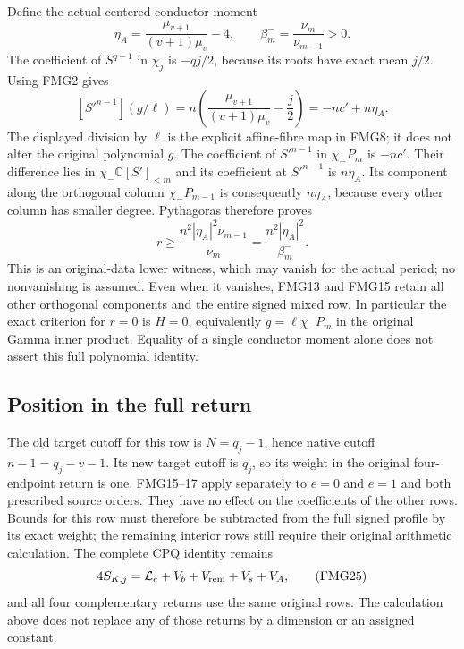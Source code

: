 \documentclass[11pt,a4paper]{article}
\begin{document}
Define the actual centered conductor moment
\[
 \eta_A=\frac{\mu_{v+1}}{(v+1)\mu_v}-4,
          \qquad \beta_m^-=\frac{\nu_m}{\nu_{m-1}}>0 .   \tag{FMG22}
\]
The coefficient of $S^{q-1}$ in $\chi_j$ is $-qj/2$,
because its roots have exact mean $j/2$. Using FMG2 gives
\[
 [S'^{n-1}](g/\ell)
    =n\left(\frac{\mu_{v+1}}{(v+1)\mu_v}-\frac j2\right)
    =-nc'+n\eta_A .                                    \tag{FMG23}
\]
The displayed division by $\ell$ is the explicit affine-fibre map
in FMG8; it does not alter the original polynomial $g$.
The coefficient of $S'^{n-1}$ in $\chi_-P_m$ is $-nc'$.
Their difference lies in $\chi_-\mathbb C[S']_{<m}$ and its
coefficient at $S'^{n-1}$ is $n\eta_A$. Its component along the orthogonal
column $\chi_-P_{m-1}$ is consequently $n\eta_A$, because every
other column has smaller degree. Pythagoras therefore proves
\[
 \boxed{\quad
     r\ge \frac{n^2|\eta_A|^2\nu_{m-1}}{\nu_m}
          =\frac{n^2|\eta_A|^2}{\beta_m^-}.\quad}         \tag{FMG24}
\]
This is an original-data lower witness, which may vanish for the
actual period; no nonvanishing is assumed. Even when it vanishes,
FMG13 and FMG15 retain all other orthogonal components and the
entire signed mixed row. In particular the exact criterion for
$r=0$ is $H=0$, equivalently $g=\ell\chi_-P_m$ in the original
Gamma inner product. Equality of a single conductor moment alone
does not assert this full polynomial identity.

\subsection{Position in the full return}
The old target cutoff for this row is $N=q_j-1$, hence native
cutoff $n-1=q_j-v-1$. Its new target cutoff is $q_j$, so its
weight in the original four-endpoint return is one. FMG15--17
apply separately to $e=0$ and $e=1$ and both prescribed source
orders. They have no effect on the coefficients of the other
rows. Bounds for this row must therefore be subtracted from the
full signed profile by its exact weight; the remaining interior
rows still require their original arithmetic calculation. The
complete CPQ identity remains
\[
 4S_{K,j}=\mathcal L_e+V_b+V_{\rm rem}+V_s+V_A,
                                                               \tag{FMG25}
\]
and all four complementary returns use the same original rows.
The calculation above does not replace any of those returns by
a dimension or an assigned constant.
\end{document}
